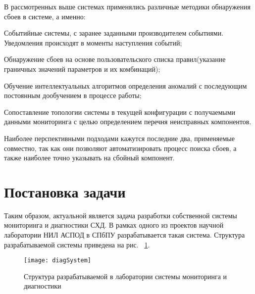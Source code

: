 В рассмотренных выше системах применялись различные методики обнаружения сбоев в системе, а именно:
\begin{itemize*}
	\item{Событийные системы, с заранее заданными производителем событиями. Уведомления происходят в моменты наступления событий;}
	\item{Обнаружение сбоев на основе пользовательского списка правил(указание граничных значений параметров и их комбинаций);}
	\item{Обучение интеллектуальных алгоритмов определения аномалий с последующим постоянным дообучением в процессе работы;}
	\item{Сопоставление топологии системы в текущей конфигурации с получаемыми данными мониторинга с целью определением перечня неисправных компонентов.}
\end{itemize*}
Наиболее перспективными подходами кажутся последние два, применяемые совместно, так как они позволяют автоматизировать процесс поиска сбоев, а также наиболее точно указывать на сбойный компонент. 

\section{Постановка задачи}

Таким образом, актуальной является задача разработки собственной системы мониторинга и диагностики СХД. В рамках одного из проектов научной лаборатории НИЛ АСПОД в СПбПУ разрабатывается такая система. Структура разрабатываемой системы приведена на рис. ~\ref{fig:diagSystem}.
\begin{figure}[!h]
	\centering
	\texttt{[image: diagSystem]}
	\caption{Структура разрабатываемой в лаборатории системы мониторинга и диагностики}
	\label{fig:diagSystem}
\end{figure}

